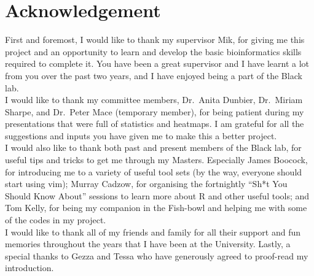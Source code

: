
\section*{\centering Acknowledgement}

First and foremost, I would like to thank my supervisor Mik, for giving me this project and an
opportunity to learn and develop the basic bioinformatics skills required to complete it.
You have been a great supervisor and I have learnt a lot from you over the past two years, and I have enjoyed being a part of the Black lab.
\\

\noindent
I would like to thank my committee members, Dr.\ Anita Dunbier, Dr.\ Miriam Sharpe, and Dr.\ Peter Mace (temporary member), for being patient during my presentations that were full of statistics and heatmaps.
I am grateful for all the suggestions and inputs you have given me to make this a better project.
\\

\noindent
I would also like to thank both past and present members of the Black lab, for useful tips and tricks to get me through my Masters.
Especially James Boocock, for introducing me to a variety of useful tool sets (by the way, everyone should start using vim); Murray Cadzow, for organising the fortnightly ``Sh*t You Should Know About'' sessions to learn more about R and other useful tools; and Tom Kelly, for being my companion in the Fish-bowl and helping me with some of the codes in my project.
\\

\noindent
I would like to thank all of my friends and family for all their support and fun memories throughout the years that I have been at the University.
Lastly, a special thanks to Gezza and Tessa who have generously agreed to proof-read my introduction.
\\

